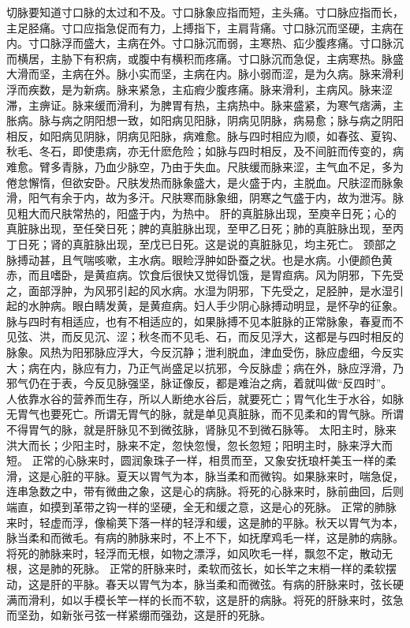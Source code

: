 \documentclass[12pt,UTF8]{ctexbook}
\begin{document}
切脉要知道寸口脉的太过和不及。寸口脉象应指而短，主头痛。寸口脉应指而长，主足胫痛。寸口应指急促而有力，上搏指下，主肩背痛。寸口脉沉而坚硬，主病在内。寸口脉浮而盛大，主病在外。寸口脉沉而弱，主寒热、疝少腹疼痛。寸口脉沉而横居，主胁下有积病，或腹中有横积而疼痛。寸口脉沉而急促，主病寒热。脉盛大滑而坚，主病在外。脉小实而坚，主病在内。脉小弱而涩，是为久病。脉来滑利浮而疾数，是为新病。脉来紧急，主疝瘕少腹疼痛。脉来滑利，主病风。脉来涩滞，主痹证。脉来缓而滑利，为脾胃有热，主病热中。脉来盛紧，为寒气痞满，主胀病。脉与病之阴阳想一致，如阳病见阳脉，阴病见阴脉，病易愈；脉与病之阴阳相反，如阳病见阴脉，阴病见阳脉，病难愈。脉与四时相应为顺，如春弦、夏钩、秋毛、冬石，即使患病，亦无什麽危险；如脉与四时相反，及不间脏而传变的，病难愈。臂多青脉，乃血少脉空，乃由于失血。尺肤缓而脉来涩，主气血不足，多为倦怠懈惰，但欲安卧。尺肤发热而脉象盛大，是火盛于内，主脱血。尺肤涩而脉象滑，阳气有余于内，故为多汗。尺肤寒而脉象细，阴寒之气盛于内，故为泄泻。脉见粗大而尺肤常热的，阳盛于内，为热中。
肝的真脏脉出现，至庾辛日死；心的真脏脉出现，至任癸日死；脾的真脏脉出现，至甲乙日死；肺的真脏脉出现，至丙丁日死；肾的真脏脉出现，至戊已日死。这是说的真脏脉见，均主死亡。
颈部之脉搏动甚，且气喘咳嗽，主水病。眼睑浮肿如卧蚕之状。也是水病。小便颜色黄赤，而且嗜卧，是黄疸病。饮食后很快又觉得饥饿，是胃疸病。风为阴邪，下先受之，面部浮肿，为风邪引起的风水病。水湿为阴邪，下先受之，足胫肿，是水湿引起的水肿病。眼白睛发黄，是黄疸病。妇人手少阴心脉搏动明显，是怀孕的征象。
脉与四时有相适应，也有不相适应的，如果脉搏不见本脏脉的正常脉象，春夏而不见弦、洪，而反见沉、涩；秋冬而不见毛、石，而反见浮大，这都是与四时相反的脉象。风热为阳邪脉应浮大，今反沉静；泄利脱血，津血受伤，脉应虚细，今反实大；病在内，脉应有力，乃正气尚盛足以抗邪，今反脉虚；病在外，脉应浮滑，乃邪气仍在于表，今反见脉强坚，脉证像反，都是难治之病，着就叫做“反四时”。
人依靠水谷的营养而生存，所以人断绝水谷后，就要死亡；胃气化生于水谷，如脉无胃气也要死亡。所谓无胃气的脉，就是单见真脏脉，而不见柔和的胃气脉。所谓不得胃气的脉，就是肝脉见不到微弦脉，肾脉见不到微石脉等。
太阳主时，脉来洪大而长；少阳主时，脉来不定，忽快忽慢，忽长忽短；阳明主时，脉来浮大而短。
正常的心脉来时，圆润象珠子一样，相贯而至，又象安抚琅杆美玉一样的柔滑，这是心脏的平脉。夏天以胃气为本，脉当柔和而微钩。如果脉来时，喘急促，连串急数之中，带有微曲之象，这是心的病脉。将死的心脉来时，脉前曲回，后则端直，如摸到革带之钩一样的坚硬，全无和缓之意，这是心的死脉。
正常的肺脉来时，轻虚而浮，像榆荚下落一样的轻浮和缓，这是肺的平脉。秋天以胃气为本，脉当柔和而微毛。有病的肺脉来时，不上不下，如抚摩鸡毛一样，这是肺的病脉。将死的肺脉来时，轻浮而无根，如物之漂浮，如风吹毛一样，飘忽不定，散动无根，这是肺的死脉。
正常的肝脉来时，柔软而弦长，如长竿之末梢一样的柔软摆动，这是肝的平脉。春天以胃气为本，脉当柔和而微弦。有病的肝脉来时，弦长硬满而滑利，如以手模长竿一样的长而不软，这是肝的病脉。将死的肝脉来时，弦急而坚劲，如新张弓弦一样紧绷而强劲，这是肝的死脉。
\end{document}
